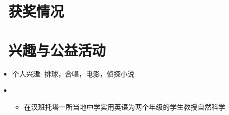 \documentclass{resume}
\begin{document}
\section{\faHeartO\ 获奖情况}

\section{\faInfo\ 兴趣与公益活动}
\begin{itemize}[parsep=0.5ex]
  \item 个人兴趣: 排球，合唱，电影，侦探小说
  \item {}
  \begin{itemize}[parsep=0.5ex]
    \item 在汉班托塔一所当地中学实用英语为两个年级的学生教授自然科学
  \end{itemize}  
\end{itemize}

%
%
\end{document}
